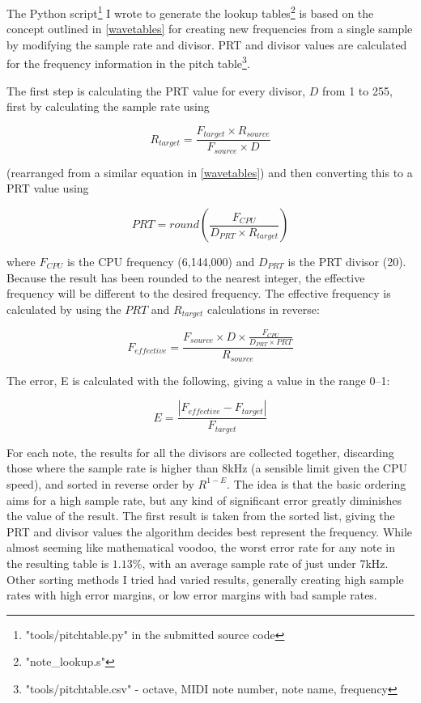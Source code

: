 The Python script\footnote{"tools/pitchtable.py" in the submitted source code} I wrote to generate 
the lookup tables\footnote{"note\_lookup.s"} is based on the concept outlined in \ref{wavetables} 
for creating new frequencies from a single sample by modifying the sample rate and divisor.  PRT and 
divisor values are calculated for the frequency information in the pitch 
table\footnote{"tools/pitchtable.csv" - octave, MIDI note number, note name, frequency}.

The first step is calculating the PRT value for every divisor, $D$ from 1 to 255, first by 
calculating the sample rate using

\[R_{target} = \frac{F_{target} \times R_{source}}{F_{source} \times D}\]

(rearranged from a similar equation in \ref{wavetables}) and then converting this to a PRT value 
using

\[PRT = round\left(\frac{F_{CPU}}{D_{PRT}\times{}R_{target}}\right)\]

where $F_{CPU}$ is the CPU frequency (6,144,000) and $D_{PRT}$ is the PRT divisor (20).  Because the 
result has been rounded to the nearest integer, the effective frequency will be different to the 
desired frequency.  The effective frequency is calculated by using the $PRT$ and $R_{target}$ 
calculations in reverse:

\[F_{effective} = \frac{F_{source}\times{}D\times{}\frac{F_{CPU}}{D_{PRT}\times{}PRT}}{R_{source}}\]

The error, E is calculated with the following, giving a value in the range 0--1:

\[E = \frac{\left|F_{effective} - F_{target}\right|}{F_{target}}\]

For each note, the results for all the divisors are collected together, discarding those where the 
sample rate is higher than 8kHz (a sensible limit given the CPU speed), and sorted in reverse order 
by $R^{1-E}$.  The idea is that the basic ordering aims for a high sample rate, but any kind of 
significant error greatly diminishes the value of the result.  The first result is taken from the 
sorted list, giving the PRT and divisor values the algorithm decides best represent the frequency.  
While almost seeming like mathematical voodoo, the worst error rate for any note in the resulting 
table is $1.13\%$, with an average sample rate of just under 7kHz.  Other sorting methods I tried 
had varied results, generally creating high sample rates with high error margins, or low error 
margins with bad sample rates.

